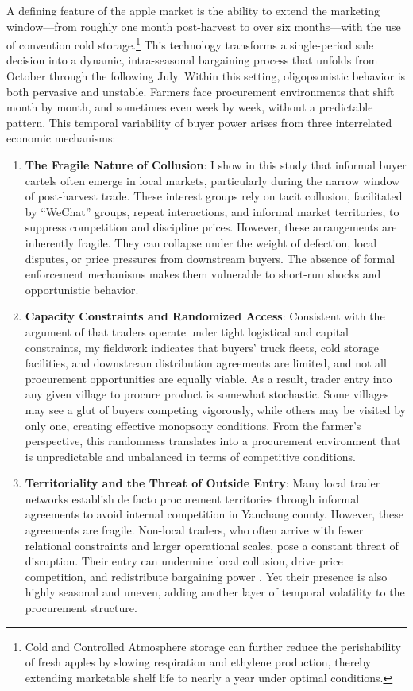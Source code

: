 A defining feature of the apple market is the ability to extend the marketing window---from roughly one month post-harvest to over six months---with the use of convention cold storage.\footnote{Cold and Controlled Atmosphere storage can further reduce the perishability of fresh apples by slowing respiration and ethylene production, thereby extending marketable shelf life to nearly a year under optimal conditions.} This technology transforms a single-period sale decision into a dynamic, intra-seasonal bargaining process that unfolds from October through the following July. Within this setting, oligopsonistic behavior is both pervasive and unstable. Farmers face procurement environments that shift month by month, and sometimes even week by week, without a predictable pattern. This temporal variability of buyer power arises from three interrelated economic mechanisms:
\begin{enumerate}
    \item \textbf{The Fragile Nature of Collusion}: I show in this study that informal buyer cartels often emerge in local markets, particularly during the narrow window of post-harvest trade. These interest groups rely on tacit collusion, facilitated by ``WeChat'' groups, repeat interactions, and informal market territories, to suppress competition and discipline prices. However, these arrangements are inherently fragile. They can collapse under the weight of defection, local disputes, or price pressures from downstream buyers. The absence of formal enforcement mechanisms makes them vulnerable to short-run shocks and opportunistic behavior.

    \item \textbf{Capacity Constraints and Randomized Access}: Consistent with the argument of \cite{ambler2023finance} that traders operate under tight logistical and capital constraints, my fieldwork indicates that buyers' truck fleets, cold storage facilities, and downstream distribution agreements are limited, and not all procurement opportunities are equally viable. As a result, trader entry into any given village to procure product is somewhat stochastic. Some villages may see a glut of buyers competing vigorously, while others may be visited by only one, creating effective monopsony conditions. From the farmer's perspective, this randomness translates into a procurement environment that is unpredictable and unbalanced in terms of competitive conditions.

    \item \textbf{Territoriality and the Threat of Outside Entry}: Many local trader networks establish de facto procurement territories through informal agreements to avoid internal competition in Yanchang county. However, these agreements are fragile. Non-local traders, who often arrive with fewer relational constraints and larger operational scales, pose a constant threat of disruption. Their entry can undermine local collusion, drive price competition, and redistribute bargaining power \citep{BARTKUS2022}. Yet their presence is also highly seasonal and uneven, adding another layer of temporal volatility to the procurement structure.
\end{enumerate}

